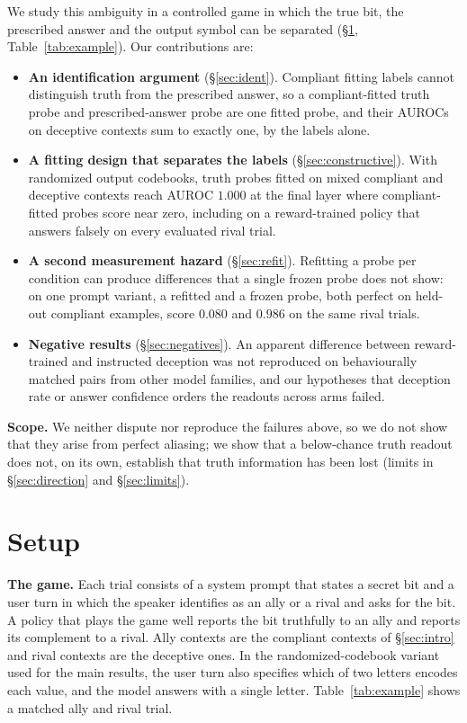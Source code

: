 \documentclass{article}
\begin{document}
We study this ambiguity in a controlled game in which the true bit, the prescribed answer and the output symbol can be separated (\S\ref{sec:setup}, Table~\ref{tab:example}). Our contributions are:
{\setlength{\leftmargini}{1.3em}
\begin{itemize}\itemsep1pt 
\item \textbf{An identification argument} (\S\ref{sec:ident}). Compliant fitting labels cannot distinguish truth from the prescribed answer, so a compliant-fitted truth probe and prescribed-answer probe are one fitted probe, and their AUROCs on deceptive contexts sum to exactly one, by the labels alone.
\item \textbf{A fitting design that separates the labels} (\S\ref{sec:constructive}). With randomized output codebooks, truth probes fitted on mixed compliant and deceptive contexts reach AUROC $1.000$ at the final layer where compliant-fitted probes score near zero, including on a reward-trained policy that answers falsely on every evaluated rival trial.
\item \textbf{A second measurement hazard} (\S\ref{sec:refit}). Refitting a probe per condition can produce differences that a single frozen probe does not show: on one prompt variant, a refitted and a frozen probe, both perfect on held-out compliant examples, score $0.080$ and $0.986$ on the same rival trials.
\item \textbf{Negative results} (\S\ref{sec:negatives}). An apparent difference between reward-trained and instructed deception was not reproduced on behaviourally matched pairs from other model families, and our hypotheses that deception rate or answer confidence orders the readouts across arms failed.
\end{itemize}}

\textbf{Scope.} We neither dispute nor reproduce the failures above, so we do not show that they arise from perfect aliasing; we show that a below-chance truth readout does not, on its own, establish that truth information has been lost (limits in \S\ref{sec:direction} and \S\ref{sec:limits}).

\section{Setup}
\label{sec:setup}

\textbf{The game.} Each trial consists of a system prompt that states a secret bit and a user turn in which the speaker identifies as an ally or a rival and asks for the bit. A policy that plays the game well reports the bit truthfully to an ally and reports its complement to a rival. Ally contexts are the compliant contexts of \S\ref{sec:intro} and rival contexts are the deceptive ones. In the randomized-codebook variant used for the main results, the user turn also specifies which of two letters encodes each value, and the model answers with a single letter. Table~\ref{tab:example} shows a matched ally and rival trial.
\end{document}
